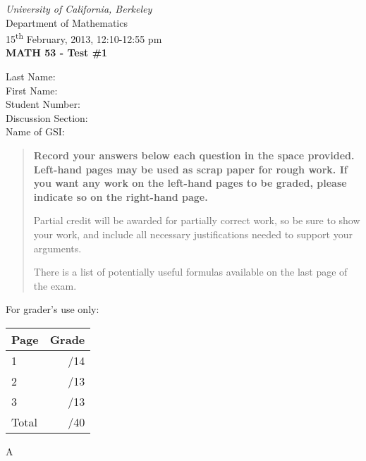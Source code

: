 \documentclass[12pt]{article}
\newcommand{\skipline}{\vspace{12pt}}
\begin{document}
\author{Instructor: Sean Fitzpatrick}
\thispagestyle{plain}
\begin{center}
\emph{University of California, Berkeley}\\
Department of Mathematics\\
15\textsuperscript{th} February, 2013, 12:10-12:55 pm\\
{\bf MATH 53 - Test \#1}\\
\end{center}
\skipline \skipline \skipline \noindent \skipline
Last Name:\underline{\hspace{350pt}}\\
\skipline
First Name:\underline{\hspace{348pt}}\\
\skipline
Student Number:\underline{\hspace{322pt}}\\
\skipline
Discussion Section: \underline{\hspace{307pt}}\\
\skipline
Name of GSI: \underline{\hspace{336pt}}\\

\vspace{0.5in}


\begin{quote}
 {\bf Record your answers below each question in the space provided.    Left-hand pages may be used as scrap paper for rough work.  If you want any work on the left-hand pages to be graded, please indicate so on the right-hand page.
 
 \bigskip
 
Partial credit will be awarded for partially correct work, so be sure to show your work, and include all necessary justifications needed to support your arguments. 

There is a list of potentially useful formulas available on the last page of the exam.}
\end{quote}


\vspace{0.5in}

For grader's use only:

\begin{table}[hbt]
\begin{center}
\begin{tabular}{|l|r|} \hline
Page&Grade\\
\hline \hline
\cline{1-2} 1 & \enspace\enspace\enspace\enspace\enspace\enspace/14\\
\cline{1-2} 2 & \enspace\enspace\enspace\enspace\enspace\enspace/13\\
\cline{1-2} 3 & \enspace\enspace\enspace\enspace\enspace\enspace/13\\
\cline{1-2} Total & \enspace\enspace\enspace\enspace\enspace\enspace/40\\
\hline
\end{tabular}

\skipline

\skipline

\skipline

A
\end{center}
\end{table}
\newpage
\end{document}

